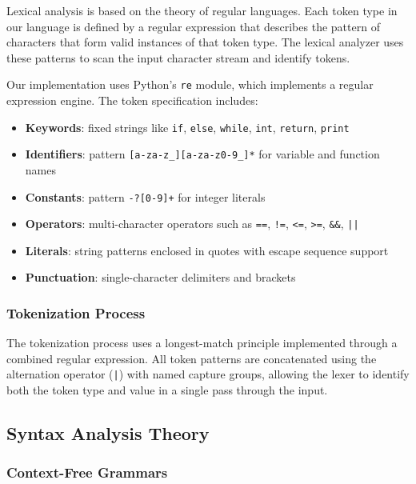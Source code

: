 \documentclass[12pt, letterpaper]{article}
\begin{document}
Lexical analysis is based on the theory of regular languages. Each token type in our language is defined by a regular expression that describes the pattern of characters that form valid instances of that token type. The lexical analyzer uses these patterns to scan the input character stream and identify tokens.

Our implementation uses Python's \texttt{re} module, which implements a regular expression engine. The token specification includes:

\begin{itemize}
    \item \textbf{Keywords}: fixed strings like \texttt{if}, \texttt{else}, \texttt{while}, \texttt{int}, \texttt{return}, \texttt{print}
    \item \textbf{Identifiers}: pattern \texttt{[a-za-z\_][a-za-z0-9\_]*} for variable and function names
    \item \textbf{Constants}: pattern \texttt{-?[0-9]+} for integer literals
    \item \textbf{Operators}: multi-character operators such as \texttt{==}, \texttt{!=}, \texttt{<=}, \texttt{>=}, \texttt{\&\&}, \texttt{||}
    \item \textbf{Literals}: string patterns enclosed in quotes with escape sequence support
    \item \textbf{Punctuation}: single-character delimiters and brackets
\end{itemize}

\subsubsection*{Tokenization Process}

The tokenization process uses a longest-match principle implemented through a combined regular expression. All token patterns are concatenated using the alternation operator (\texttt{|}) with named capture groups, allowing the lexer to identify both the token type and value in a single pass through the input.

\subsection*{Syntax Analysis Theory}

\subsubsection*{Context-Free Grammars}
\end{document}
